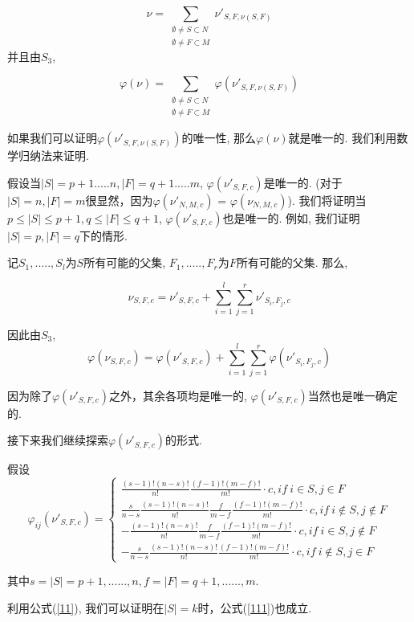 $$\nu = \sum_{\substack{\emptyset\neq S\subset N\\\emptyset\neq F\subset M}}\nu'_{S,F,\nu(S,F)}$$ 并且由$S_3$,

$$\varphi(\nu) = \sum_{\substack{\emptyset\neq S\subset N\\\emptyset\neq F\subset M}}\varphi(\nu'_{S,F,\nu(S,F)})$$

如果我们可以证明$\varphi(\nu'_{S,F,\nu(S,F)})$的唯一性, 那么$\varphi(\nu)$就是唯一的.
我们利用数学归纳法来证明.

假设当$|S| = p + 1 ..... n, |F| = q + 1 ..... m$, $\varphi(\nu'_{S,F,c})$是唯一的. (对于 
$|S| = n, |F| = m$很显然，因为$\varphi(\nu'_{N,M,c})$ = $\varphi(\nu_{N,M,c})$).
我们将证明当$p\leq|S|\leq p+1, q\leq|F|\leq q+1$, $\varphi(\nu'_{S,F,c})$也是唯一的.
例如, 我们证明$|S|=p, |F|=q$下的情形.

记$S_1, ....., S_l$为$S$所有可能的父集, $F_1, ....., F_r$为$F$所有可能的父集.
那么,

$$\nu_{S,F,c} = \nu'_{S,F,c}+\sum_{i=1}^{l}\sum_{j=1}^{r}\nu'_{S_i,F_j,c}$$

因此由$S_3$,
\begin{equation}
	\varphi(\nu_{S,F,c}) = \varphi(\nu'_{S,F,c})+\sum_{i=1}^{l}\sum_{j=1}^{r}\varphi(\nu'_{S_i,F_j,c})\label{11}
\end{equation}


因为除了$\varphi(\nu'_{S,F,c})$之外，其余各项均是唯一的, $\varphi(\nu'_{S,F,c})$当然也是唯一确定的.

接下来我们继续探索$\varphi(\nu'_{S,F,c})$的形式.

假设 
\begin{equation}
	\label{111}
	\varphi_{ij}(\nu'_{S,F,c})=\left\{
	\begin{array}{lr}
		\frac{(s-1)!(n-s)!}{n!}\frac{(f-1)!(m-f)!}{m!}\cdot c, if\  i\in S, j\in F \\
		\frac{s}{n-s}\frac{(s-1)!(n-s)!}{n!}\frac{f}{m-f}\frac{(f-1)!(m-f)!}{m!}\cdot c, if\  i\notin S, j\notin F \\ 
		-\frac{(s-1)!(n-s)!}{n!}\frac{f}{m-f}\frac{(f-1)!(m-f)!}{m!}\cdot c, if\  i\in S, j\notin F \\ 
		-\frac{s}{n-s}\frac{(s-1)!(n-s)!}{n!}\frac{(f-1)!(m-f)!}{m!}\cdot c, if\  i\notin S, j\in F
	\end{array}
	\right.
\end{equation}


其中$s = |S| = p+1 ,......, n, f = |F| = q+1 ,......, m$.

利用公式(\ref{11}), 我们可以证明在$|S| = k$时，公式(\ref{111})也成立.

